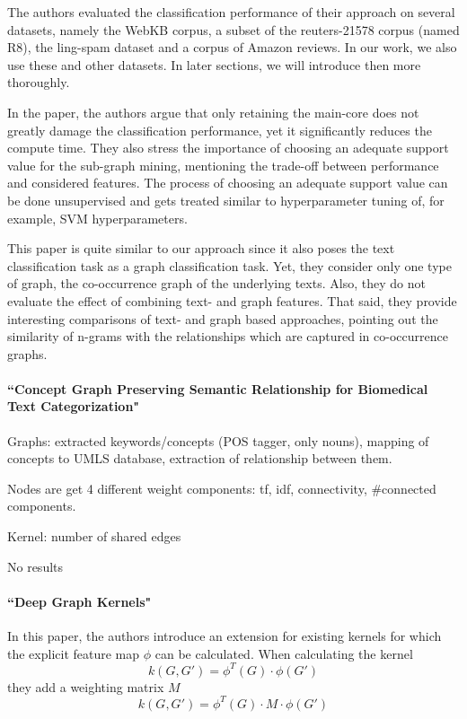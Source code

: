 The authors evaluated the classification performance of their approach on several datasets, namely the WebKB corpus, a subset of the reuters-21578 corpus (named R8), the ling-spam dataset and a corpus of Amazon reviews.
In our work, we also use these and other datasets. In later sections, we will introduce then more thoroughly.

In the paper, the authors argue that only retaining the main-core does not greatly damage the classification performance, yet it significantly reduces the compute time.
They also stress the importance of choosing an adequate support value for the sub-graph mining, mentioning the trade-off between performance and considered features. The process of choosing an adequate support value can be done unsupervised and gets treated similar to hyperparameter tuning of, for example, SVM hyperparameters.

This paper is quite similar to our approach since it also poses the text classification task as a graph classification task. Yet, they consider only one type of graph, the co-occurrence graph of the underlying texts.
Also, they do not evaluate the effect of combining text- and graph features.
That said, they provide interesting comparisons of text- and graph based approaches, pointing out the similarity of n-grams with the relationships which are captured in co-occurrence graphs.

\paragraph{``Concept Graph Preserving Semantic Relationship for Biomedical Text Categorization" \cite{Gulrandhe2015}}
Graphs: extracted keywords/concepts (POS tagger, only nouns), mapping of concepts to UMLS database, extraction of relationship between them.

Nodes are get 4 different weight components: tf, idf, connectivity, \#connected components.

Kernel: number of shared edges

No results

\paragraph{``Deep Graph Kernels" \cite{Yanardag2015}}
In this paper, the authors introduce an extension for existing kernels for which the explicit feature map $\phi$ can be calculated.
When calculating the kernel
\begin{equation*}
k(G, G') = \phi^T(G) \cdot \phi(G')
\end{equation*}
they add a weighting matrix $M$
\begin{equation*}
k(G, G') = \phi^T(G) \cdot M \cdot \phi(G')
\end{equation*}


